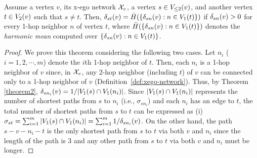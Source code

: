\begin{theorem}
\label{theorem4} 
Assume a vertex $v$, its x-ego network $\XN{v}$, a vertex $s \in \LV{v}{2}$, and another vertex $t \in \V{v}{2}$ such that $s \ne t$.
Then, $\D{s}{t}{v} = \bar{H}(\{\D{s}{n}{v} : n \in \V{t}{1}\})$ if $\D{s}{n}{v} > 0$ for every 1-hop neighbor $n$ of vertex $t$, where $\bar{H}(\{\D{s}{n}{v} : n \in \V{t}{1}\})$ denotes the {\em harmonic mean} computed over $\{\D{s}{n}{v} : n \in \V{t}{1}\}$.
\begin{proof}
We prove this theorem considering the following two cases.
Let $n_i$ ($i=1,2,\cdots, m$) denote the $i$th 1-hop neighbor of $t$.
Then, each $n_i$ is a 1-hop neighbor of $v$ since, in $\XN{v}$, any 2-hop neighbor (including $t$) of $v$ can be connected only to a 1-hop neighbor of $v$ (Definition~\ref{def:xego-network}).
Thus, by Theorem \ref{theorem2}, $\D{s}{n_i}{v} = {1}/{|\V{s}{1} \cap \V{n_i}{1}|}$. 
Since $|\V{s}{1} \cap \V{n_i}{1}|$ represents the number of shortest paths from $s$ to $n_i$ (i.e., $\sigma_{sn_i}$) and each $n_i$ has an edge to $t$, the total number of shortest paths from $s$ to $t$ can be expressed as (i) $\sigma_{st} = \sum_{i=1}^m |\V{s}{1} \cap \V{n_i}{1}| = \sum_{i=1}^m 1/\D{s}{n_i}{v}$. 
On the other hand, the path $s-v-n_i-t$ is the only shortest path from $s$ to $t$ via both $v$ and $n_i$ since the length of the path is 3 and any other path from $s$ to $t$ via both $v$ and $n_i$ must be longer.

\end{proof}
\end{theorem}
